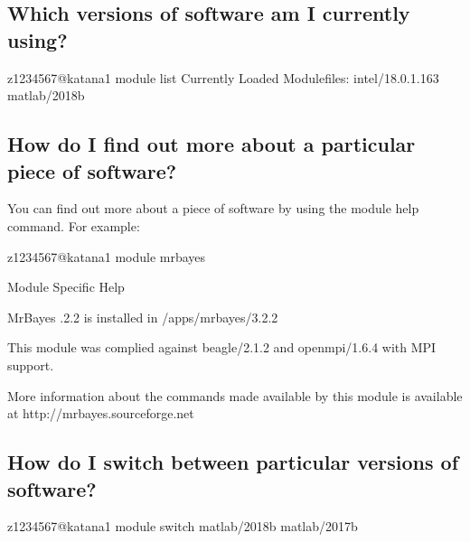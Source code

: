\documentclass[letterpaper,10pt,english]{sphinxmanual}
\begin{document}
\subsection{Which versions of software am I currently using?}
\label{\detokenize{software/environment_modules:which-versions-of-software-am-i-currently-using}}
\begin{sphinxVerbatim}[commandchars=\\\{\}]
\PYG{o}{[}z1234567@katana1 \PYGZti{}\PYG{o}{]}\PYGZdl{} module list
Currently Loaded Modulefiles:
  intel/18.0.1.163    matlab/2018b
\end{sphinxVerbatim}


\subsection{How do I find out more about a particular piece of software?}
\label{\detokenize{software/environment_modules:how-do-i-find-out-more-about-a-particular-piece-of-software}}
You can find out more about a piece of software by using the module help command. For example:

\begin{sphinxVerbatim}[commandchars=\\\{\}]
\PYG{o}{[}z1234567@katana1 \PYGZti{}\PYG{o}{]}\PYGZdl{} module  mrbayes

\PYGZhy{}\PYGZhy{}\PYGZhy{}\PYGZhy{}\PYGZhy{}\PYGZhy{}\PYGZhy{}\PYGZhy{}\PYGZhy{}\PYGZhy{}\PYGZhy{} Module Specific Help   \PYGZhy{}\PYGZhy{}\PYGZhy{}\PYGZhy{}\PYGZhy{}\PYGZhy{}\PYGZhy{}\PYGZhy{}\PYGZhy{}\PYGZhy{}\PYGZhy{}\PYGZhy{}\PYGZhy{}\PYGZhy{}

MrBayes .2.2 is installed in /apps/mrbayes/3.2.2

This module was complied against beagle/2.1.2 and openmpi/1.6.4 with MPI support.

More information about the commands made available by this module is available
at http://mrbayes.sourceforge.net
\end{sphinxVerbatim}


\subsection{How do I switch between particular versions of software?}
\label{\detokenize{software/environment_modules:how-do-i-switch-between-particular-versions-of-software}}
\begin{sphinxVerbatim}[commandchars=\\\{\}]
\PYG{o}{[}z1234567@katana1 \PYGZti{}\PYG{o}{]}\PYGZdl{} module switch matlab/2018b matlab/2017b
\end{sphinxVerbatim}
\end{document}
